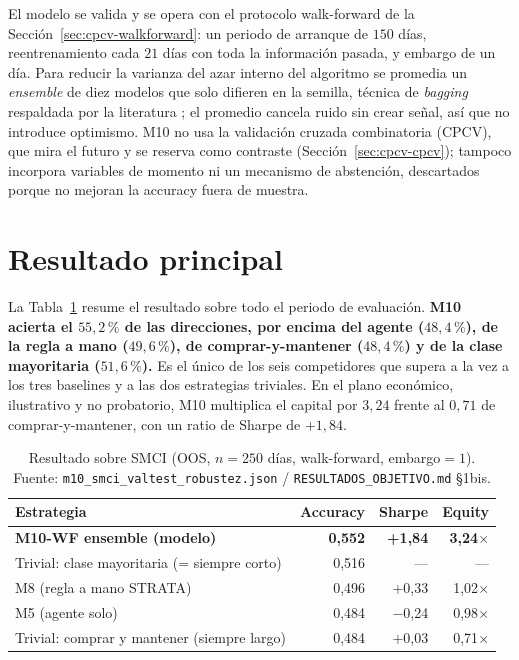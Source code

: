 El modelo se valida y se opera con el protocolo walk-forward de la Sección~\ref{sec:cpcv-walkforward}: un periodo de arranque de $150$ días, reentrenamiento cada $21$ días con toda la información pasada, y embargo de un día. Para reducir la varianza del azar interno del algoritmo se promedia un \emph{ensemble} de diez modelos que solo difieren en la semilla, técnica de \emph{bagging} respaldada por la literatura \cite{breiman1996, dietterich2000}; el promedio cancela ruido sin crear señal, así que no introduce optimismo. M10 no usa la validación cruzada combinatoria (CPCV), que mira el futuro y se reserva como contraste (Sección~\ref{sec:cpcv-cpcv}); tampoco incorpora variables de momento ni un mecanismo de abstención, descartados porque no mejoran la accuracy fuera de muestra.

\section{Resultado principal}
\label{sec:resultado}

La Tabla~\ref{tab:smci-resultado} resume el resultado sobre todo el periodo de evaluación. \textbf{M10 acierta el $55{,}2\,\%$ de las direcciones, por encima del agente ($48{,}4\,\%$), de la regla a mano ($49{,}6\,\%$), de comprar-y-mantener ($48{,}4\,\%$) y de la clase mayoritaria ($51{,}6\,\%$).} Es el único de los seis competidores que supera a la vez a los tres baselines y a las dos estrategias triviales. En el plano económico, ilustrativo y no probatorio, M10 multiplica el capital por $3{,}24$ frente al $0{,}71$ de comprar-y-mantener, con un ratio de Sharpe de $+1{,}84$.

\begin{table}[htbp]
\centering
\caption{Resultado sobre SMCI (OOS, $n=250$ días, walk-forward, embargo$=1$). Fuente: \texttt{m10\_smci\_valtest\_robustez.json} / \texttt{RESULTADOS\_OBJETIVO.md} §1bis.}
\label{tab:smci-resultado}
\begin{tabular}{lrrr}
\hline
Estrategia & Accuracy & Sharpe & Equity \\
\hline
\textbf{M10-WF ensemble (modelo)} & \textbf{0,552} & \textbf{+1,84} & \textbf{3,24$\times$} \\
Trivial: clase mayoritaria (= siempre corto) & 0,516 & --- & --- \\
M8 (regla a mano STRATA) & 0,496 & +0,33 & 1,02$\times$ \\
M5 (agente solo) & 0,484 & $-$0,24 & 0,98$\times$ \\
Trivial: comprar y mantener (siempre largo) & 0,484 & +0,03 & 0,71$\times$ \\
\hline
\end{tabular}
\end{table}

